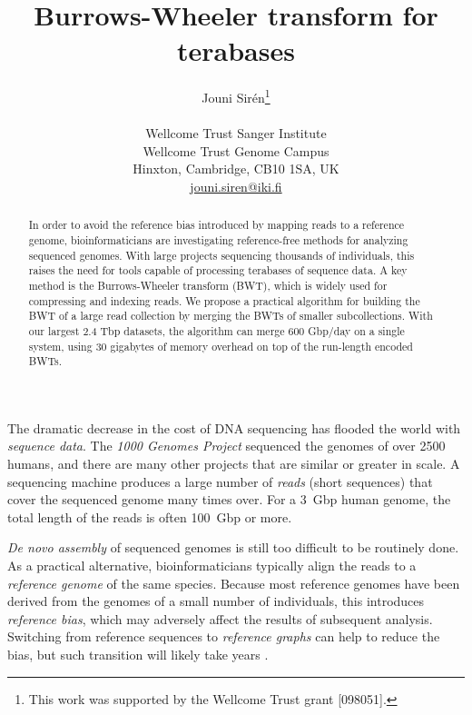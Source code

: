 \documentclass[smallabstract,smallcaptions]{dccpaper}
\begin{document}
\title
{\large
\textbf{Burrows-Wheeler transform for terabases}
}


\author{%
Jouni Sirén\thanks{This work was supported by the Wellcome Trust grant [098051].} \\[0.5em]
{\small\begin{minipage}{\linewidth}\begin{center}
\begin{tabular}{c}
Wellcome Trust Sanger Institute \\
Wellcome Trust Genome Campus \\
Hinxton, Cambridge, CB10 1SA, UK \\
\url{jouni.siren@iki.fi}
\end{tabular}
\end{center}\end{minipage}}
}


\maketitle
\thispagestyle{empty}


\begin{abstract}
In order to avoid the reference bias introduced by mapping reads to a reference genome, bioinformaticians are investigating reference-free methods for analyzing sequenced genomes. With large projects sequencing thousands of individuals, this raises the need for tools capable of processing terabases of sequence data. A key method is the Burrows-Wheeler transform (BWT), which is widely used for compressing and indexing reads. We propose a practical algorithm for building the BWT of a large read collection by merging the BWTs of smaller subcollections. With our largest 2.4 Tbp datasets, the algorithm can merge 600 Gbp/day on a single system, using 30 gigabytes of memory overhead on top of the run-length encoded BWTs.
\end{abstract}



The dramatic decrease in the cost of DNA sequencing has flooded the world with \emph{sequence data}. The \emph{1000 Genomes Project} \cite{1000GP2015} sequenced the genomes of over 2500 humans, and there are many other projects that are similar or greater in scale. A sequencing machine produces a large number of \emph{reads} (short sequences) that cover the sequenced genome many times over. For a 3~Gbp human genome, the total length of the reads is often 100~Gbp or more.

\emph{De novo assembly} of sequenced genomes is still too difficult to be routinely done. As a practical alternative, bioinformaticians typically align the reads to a \emph{reference genome} of the same species. Because most reference genomes have been derived from the genomes of a small number of individuals, this introduces \emph{reference bias}, which may adversely affect the results of subsequent analysis. Switching from reference sequences to \emph{reference graphs} can help to reduce the bias, but such transition will likely take years \cite{Church2015}.
\end{document}
